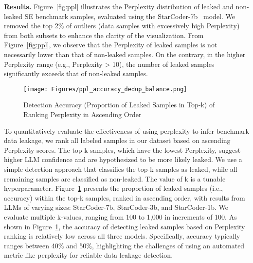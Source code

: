\vspace{0.2cm}
\noindent
\textbf{Results.}
Figure~\ref{fig:ppl} illustrates the Perplexity distribution of leaked and non-leaked SE benchmark samples, evaluated using the StarCoder-7b~\cite{starcoder_one} model. We removed the top 2\% of outliers (data samples with excessively high Perplexity) from both subsets to enhance the clarity of the visualization.
From Figure~\ref{fig:ppl}, we observe that the Perplexity of leaked samples is not necessarily lower than that of non-leaked samples. On the contrary, in the higher Perplexity range (e.g., Perplexity > 10), the number of leaked samples significantly exceeds that of non-leaked samples. 






\begin{figure}[t] 
    \centering
    \texttt{[image: Figures/ppl\_accuracy\_dedup\_balance.png]} 
    \vspace{-0.3cm}
    \caption{Detection Accuracy (Proportion of Leaked Samples in Top-k) of Ranking Perplexity in Ascending Order} 
     \vspace{-0.7cm}
    \label{fig:ranking_ppl_accuracy}
\end{figure}


To quantitatively evaluate the effectiveness of using perplexity to infer benchmark data leakage, we rank all labeled samples in our dataset based on ascending Perplexity scores. The top-k samples, which have the lowest Perplexity, suggest higher LLM confidence and are hypothesized to be more likely leaked. We use a simple detection approach that classifies the top-k samples as leaked, while all remaining samples are classified as non-leaked. The value of k is a tunable hyperparameter.
Figure~\ref{fig:ranking_ppl_accuracy} presents the proportion of leaked samples (i.e., accuracy) within the top-k samples, ranked in ascending order, with results from LLMs of varying sizes: StarCoder-7b, StarCoder-3b, and StarCoder-1b. We evaluate multiple k-values, ranging from 100 to 1,000 in increments of 100.
As shown in Figure~\ref{fig:ranking_ppl_accuracy}, the accuracy of detecting leaked samples based on Perplexity ranking is relatively low across all three models.
Specifically, accuracy typically ranges between 40\% and 50\%, highlighting the challenges of using an automated metric like perplexity for reliable data leakage detection.










